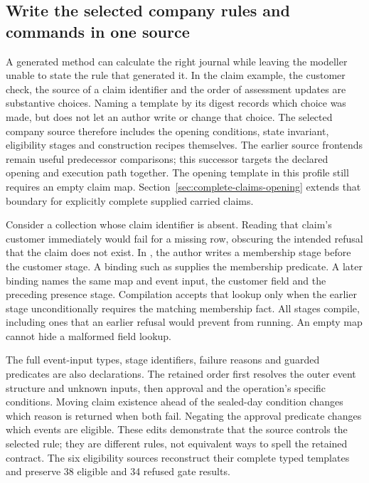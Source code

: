\subsection{Write the selected company rules and commands in one source}
\label{sec:selected-company-source}

A generated method can calculate the right journal while leaving the modeller
unable to state the rule that generated it. In the claim example, the customer
check, the source of a claim identifier and the order of assessment updates are
substantive choices. Naming a template by its digest records which choice was
made, but does not let an author write or change that choice. The selected
company source therefore includes the opening conditions, state invariant,
eligibility stages and construction recipes themselves. The earlier source
frontends remain useful predecessor comparisons; this successor targets the
declared opening and execution path together. The opening template in
this profile still requires an empty claim map. Section~\ref{sec:complete-claims-opening}
extends that boundary for explicitly complete supplied carried claims.

Consider a collection whose claim identifier is absent. Reading that claim's
customer immediately would fail for a missing row, obscuring the intended
refusal that the claim does not exist. In , the
author writes a membership stage before the customer stage. A binding such as
 supplies the membership
predicate. A later  binding names the same map and event
input, the customer field and the preceding presence stage. Compilation accepts
that lookup only when the earlier stage unconditionally requires the matching
membership fact. All stages compile, including ones that an earlier refusal
would prevent from running. An empty map cannot hide a malformed field lookup.

The full event-input types, stage identifiers, failure reasons and guarded
predicates are also declarations. The retained order first resolves the outer
event structure and unknown inputs, then approval and the operation's specific
conditions. Moving claim existence ahead of the sealed-day condition changes
which reason is returned when both fail. Negating the approval predicate
changes which events are eligible. These edits demonstrate that the source
controls the selected rule; they are different rules, not equivalent ways to
spell the retained contract. The six eligibility sources reconstruct their
complete typed templates and preserve 38 eligible and 34 refused gate results.

